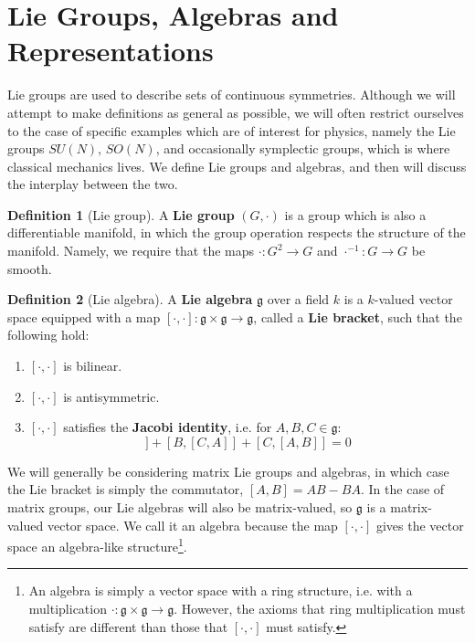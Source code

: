 \documentclass[11pt, oneside]{article}   	%
\theoremstyle{definition}
\newtheorem{definition}{Definition}[section]
\begin{document}
\newpage
\section{Lie Groups, Algebras and Representations}

Lie groups are used to describe sets of continuous symmetries. Although we will attempt to 
make definitions as general as possible, we will often restrict ourselves to the case of specific 
examples which are of interest for physics, namely the Lie groups $SU(N)$, $SO(N)$, and 
occasionally symplectic groups, which is where classical mechanics lives. We define Lie groups 
and algebras, and then will discuss the 
interplay between the two.

\begin{definition}[Lie group]
	A \textbf{Lie group} $(G, \cdot)$ is a group which is also a differentiable manifold, in which the 
	group operation respects the structure of the manifold. Namely, we require that the maps 
	$\cdot : G^2\rightarrow G$ and $\cdot^{-1} : G\rightarrow G$ be smooth.
\end{definition}

\begin{definition}[Lie algebra]
	A \textbf{Lie algebra} $\mathfrak g$ over a field $k$ is a $k$-valued vector space equipped with 
	a map $[\cdot, \cdot] : \mathfrak g\times\mathfrak g\rightarrow\mathfrak g$, called a \textbf{Lie 
	bracket}, such that the following hold:
	\begin{enumerate}
		\item $[\cdot, \cdot]$ is bilinear.
		\item $[\cdot, \cdot]$ is antisymmetric. 
		\item $[\cdot, \cdot]$ satisfies the \textbf{Jacobi identity}, i.e. for $A, B, C\in\mathfrak g$:
		\begin{equation}
			[A, [B, C]] + [B, [C, A]] + [C, [A, B]] = 0
		\end{equation}
	\end{enumerate}
\end{definition}

We will generally be considering matrix Lie groups and algebras, in which case the Lie bracket is 
simply the commutator, $[A, B] = AB - BA$. In the case of matrix groups, our Lie algebras will 
also be matrix-valued, so $\mathfrak g$ is a matrix-valued vector space. We call it an algebra 
because the map $[\cdot, \cdot]$ gives the vector space an algebra-like structure\footnote{An 
algebra is simply a vector space with a ring structure, i.e. with a multiplication $\cdot : \mathfrak 
g\times \mathfrak g \rightarrow\mathfrak g$. However, the axioms that ring multiplication must satisfy 
are different than those that $[\cdot, \cdot]$ must satisfy.}.
\end{document}
